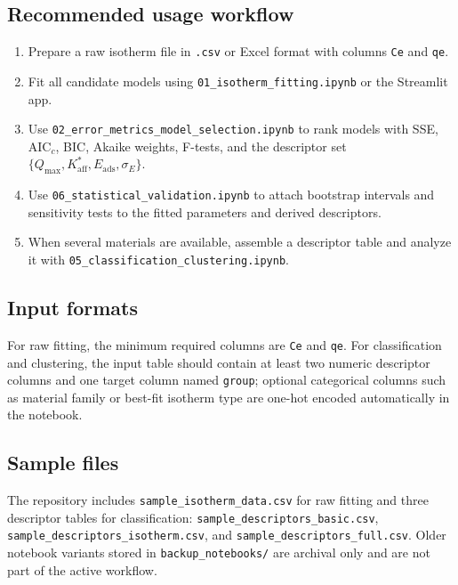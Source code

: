 \documentclass[journal=aamick,manuscript=article]{achemso}
\begin{document}
\subsection{Recommended usage workflow}
\label{sec:si_notebook_workflow}

\begin{enumerate}
	\item Prepare a raw isotherm file in \texttt{.csv} or Excel format with
	columns \texttt{Ce} and \texttt{qe}.
	\item Fit all candidate models using
	\texttt{01\_isotherm\_fitting.ipynb} or the Streamlit app.
	\item Use \texttt{02\_error\_metrics\_model\_selection.ipynb} to rank models
	with SSE, AIC$_c$, BIC, Akaike weights, F-tests, and the descriptor set
	$\{Q_{\max}, K_{\mathrm{aff}}^{\ast}, E_{\mathrm{ads}}, \sigma_E\}$.
	\item Use \texttt{06\_statistical\_validation.ipynb} to attach bootstrap
	intervals and sensitivity tests to the fitted parameters and derived
	descriptors.
	\item When several materials are available, assemble a descriptor table and
	analyze it with \texttt{05\_classification\_clustering.ipynb}.
\end{enumerate}

\subsection{Input formats}
\label{sec:si_notebook_inputs}

For raw fitting, the minimum required columns are \texttt{Ce} and \texttt{qe}.
For classification and clustering, the input table should contain at least two
numeric descriptor columns and one target column named \texttt{group}; optional
categorical columns such as material family or best-fit isotherm type are
one-hot encoded automatically in the notebook.

\subsection{Sample files}
\label{sec:si_notebook_samples}

The repository includes \texttt{sample\_isotherm\_data.csv} for raw fitting and
three descriptor tables for classification:
\texttt{sample\_descriptors\_basic.csv},
\texttt{sample\_descriptors\_isotherm.csv}, and
\texttt{sample\_descriptors\_full.csv}. Older notebook variants stored in
\texttt{backup\_notebooks/} are archival only and are not part of the active
workflow.


% 
\end{document}
